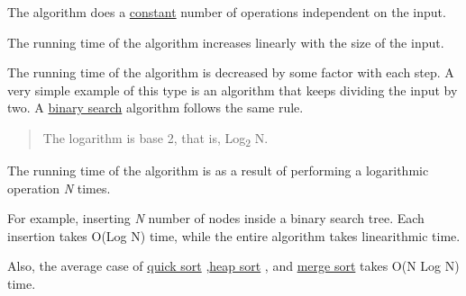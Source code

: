 
The algorithm does a
\href{https://en.wikipedia.org/wiki/Time_complexity\#Constant_time}{constant} number of operations independent on the input.


\hypertarget{linear-on}{%
	\label{linear-on}}

The running time of the algorithm increases linearly with the size of
the input.

\hypertarget{cb12}{}
\begin{Shaded}
	\begin{Highlighting}[]
		(i = }0}; i \textless{} n; i++ )}
		    k++;}
	\end{Highlighting}
\end{Shaded}

\hypertarget{logarithmic-olog-n}{%
	\label{logarithmic-olog-n}}

The running time of the algorithm is decreased by some factor with each
step. A very simple example of this type is an algorithm that keeps
dividing the input by two. A
\href{https://en.wikipedia.org/wiki/Binary_search_algorithm}{binary
search} algorithm follows the same rule.

\hypertarget{cb13}{}
\begin{Shaded}
	\begin{Highlighting}[]
		(n \textgreater{} }0})\{}
		   n /= }2};}
		\}}
	\end{Highlighting}
\end{Shaded}

\begin{quote}
	The logarithm is base 2, that is, Log\textsubscript{2} N.
\end{quote}

\hypertarget{linearithmic-on-log-n}{%
	\label{linearithmic-on-log-n}}

The running time of the algorithm is as a result of performing a
logarithmic operation \emph{N} times.

For example, inserting \emph{N} number of nodes inside a binary search
tree. Each insertion takes O(Log N) time, while the entire algorithm
takes linearithmic time.

Also, the average case of
\href{https://en.wikipedia.org/wiki/Quicksort}{quick sort}
,\href{https://en.wikipedia.org/wiki/Heapsort}{heap sort} , and
\href{https://en.wikipedia.org/wiki/Merge_sort}{merge sort} takes O(N
Log N) time.

